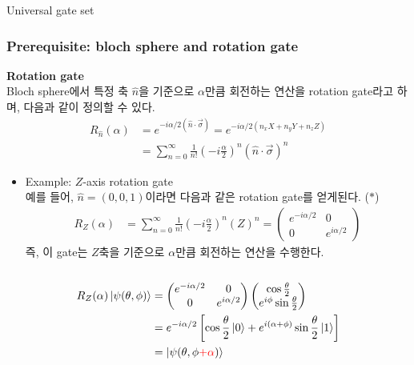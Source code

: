 \documentclass[9pt]{beamer}
\begin{document}
\begin{section}{Universal gate set}
        \begin{frame}
            \frametitle{Prerequisite: bloch sphere and rotation gate}
            \textbf{Rotation gate}
            \\Bloch sphere에서 특정 축 $\hat n$을 기준으로 $\alpha$만큼 회전하는 연산을 rotation gate라고 하며, 다음과 같이 정의할 수 있다.
            $$\begin{aligned} R_{\hat n}(\alpha) &= e^{-i \alpha/2 (\hat n \cdot \vec \sigma)} =  e^{-i \alpha/2 (n_x X + n_y Y + n_z Z)} \\ &= \sum^\infty_{n=0} \frac{1}{n!} (-i \frac{\alpha}{2})^n (\hat n \cdot  \vec\sigma)^n \end{aligned}$$
            \begin{itemize}
                \item Example: $Z$-axis rotation gate
                \\ 예를 들어, $\hat n = (0, 0, 1)$이라면 다음과 같은 rotation gate를 얻게된다. ($\ast$)
                $$\begin{aligned} R_{Z}(\alpha) &= \sum^\infty_{n=0} \frac{1}{n!} \left( -i \frac{\alpha}{2} \right)^n (Z)^n = \begin{pmatrix} e^{-i\alpha/2} & 0 \\ 0 &  e^{i\alpha/2}  \end{pmatrix} \end{aligned}$$
                즉, 이 gate는 $Z$축을 기준으로 $\alpha$만큼 회전하는 연산을 수행한다.    
            \end{itemize}
            \begin{columns}
                \begin{column}{0.7\textwidth}
                    \small \[ \begin{aligned} R_{Z}(\alpha) \ket{\psi(\theta, \phi)} &= \begin{pmatrix} e^{-i\alpha/2} & 0 \\ 0 &  e^{i\alpha/2}  \end{pmatrix}  \begin{pmatrix} \cos \frac{\theta}{2}  \\  e^{i \phi} \sin \frac{\theta}{2} \end{pmatrix} \\  &= e^{-i \alpha/2}\left[ \cos \frac{\theta}{2} \ket 0 + e^{i(\alpha+\phi) } \sin \frac{\theta}{2}  \ket 1 \right]  \\ &= \ket{\psi(\theta, \phi {\color{red}+\alpha})}\end{aligned} 
                    \]

\end{column}
\end{columns}
\end{frame}
\end{section}
\end{document}
